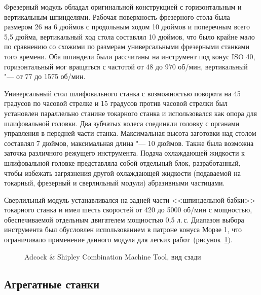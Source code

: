 Фрезерный модуль обладал оригинальной конструкцией с горизонтальным и вертикальным шпинделями. Рабочая поверхность фрезерного стола была размером 26 на 6 дюймов с продольным ходом 10 дюймов и поперечным всего 5,5 дюйма, вертикальный ход стола составлял 10 дюймов, что было крайне мало по сравнению со схожими по размерам универсальными фрезерными станками того времени. Оба шпиндели были рассчитаны на инструмент под конус ISO 40, горизонтальный мог вращаться с частотой от 48 до 970 об/мин, вертикальный "--- от 77 до 1575 об/мин.

Универсальный стол шлифовального станка с возможностью поворота на 45 градусов по часовой стрелке и 15 градусов против часовой стрелки был установлен параллельно станине токарного станка и использовался как опора для шлифовальной головки. Два зубчатых колеса соединяли головку с органами управления в передней части станка. Максимальная высота заготовки над столом составлял 7 дюймов, максимальная длина "--- 10 дюймов. Также была возможна заточка различного режущего инструмента. Подача охлаждающей жидкости к шлифовальной головке представляла собой отдельный блок, разработанный, чтобы избежать загрязнения другой охлаждающей жидкости (подаваемой на токарный, фрезерный и сверлильный модули) абразивными частицами.

Сверлильный модуль устанавливался на задней части <<шпиндельной бабки>> токарного станка и имел шесть скоростей от 420 до 5000 об/мин с мощностью, обеспечиваемой отдельным двигателем мощностью 0,5 л.\,с. Диапазон выбора инструмента был обусловлен использованием в патроне конуса Морзе 1, что ограничивало применение данного модуля для легких работ~(рисунок~\cref{fig:adcock-2}).

\begin{figure}[ht]
	\caption{Adcock \& Shipley Combination Machine Tool, вид сзади}\label{fig:adcock-2}
\end{figure}

\subsection{Агрегатные станки}

